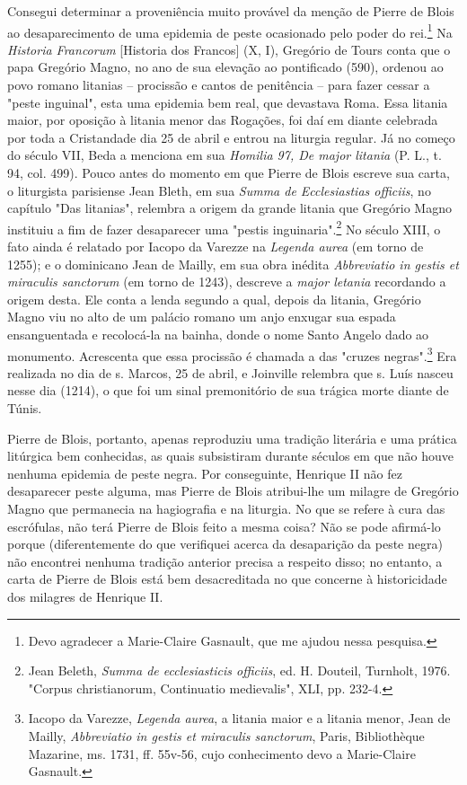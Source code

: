 \documentclass[a5paper]{book}
\begin{document}
Consegui determinar a proveniência muito provável da menção de Pierre de Blois ao desaparecimento de uma epidemia de peste ocasionado pelo poder do rei.\footnote{Devo agradecer a Marie-Claire Gasnault, que me ajudou nessa pesquisa.} Na \textit{Historia Francorum} [Historia dos Francos] (X, I), Gregório de Tours conta que o papa Gregório Magno, no ano de sua elevação ao pontif{\kern0pt}icado (590), ordenou ao povo romano litanias -- procissão e cantos de penitência -- para fazer cessar a "peste inguinal", esta uma epidemia bem real, que devastava Roma. Essa litania maior, por oposição à litania menor das Rogações, foi daí em diante celebrada por toda a Cristandade dia 25 de abril e entrou na liturgia regular. Já no começo do século VII, Beda a menciona em sua \textit{Homilia 97, De major litania} (P. L., t. 94, col. 499). Pouco antes do momento em que Pierre de Blois escreve sua carta, o liturgista parisiense Jean Bleth, em sua \textit{Summa de Ecclesiastias of{\kern0pt}f{\kern0pt}iciis}, no capítulo "Das litanias", relembra a origem da grande litania que Gregório Magno instituiu a f{\kern0pt}im de fazer desaparecer uma "pestis inguinaria".\footnote{Jean Beleth, \textit{Summa de ecclesiasticis of{\kern0pt}f{\kern0pt}iciis}, ed. H. Douteil, Turnholt, 1976. "Corpus christianorum, Continuatio medievalis", XLI, pp. 232-4.} No século XIII, o fato ainda é relatado por Iacopo da Varezze na \textit{Legenda aurea} (em torno de 1255); e o dominicano Jean de Mailly, em sua obra inédita \textit{Abbreviatio in gestis et miraculis sanctorum} (em torno de 1243), descreve a \textit{major letania} recordando a origem desta. Ele conta a lenda segundo a qual, depois da litania, Gregório Magno viu no alto de um palácio romano um anjo enxugar sua espada ensanguentada e recolocá-la na bainha, donde o nome Santo Angelo dado ao monumento. Acrescenta que essa procissão é chamada a das "cruzes negras".\footnote{Iacopo da Varezze, \textit{Legenda aurea}, a litania maior e a litania menor, Jean de Mailly, \textit{Abbreviatio in gestis et miraculis sanctorum}, Paris, Bibliothèque Mazarine, ms. 1731, f{\kern0pt}f. 55v-56, cujo conhecimento devo a Marie-Claire Gasnault.} Era realizada no dia de s. Marcos, 25 de abril, e Joinville relembra que s. Luís nasceu nesse dia (1214), o que foi um sinal premonitório de sua trágica morte diante de Túnis.

Pierre de Blois, portanto, apenas reproduziu uma tradição literária e uma prática litúrgica bem conhecidas, as quais subsistiram durante séculos em que não houve nenhuma epidemia de peste negra. Por conseguinte, Henrique II não fez desaparecer peste alguma, mas Pierre de Blois atribui-lhe um milagre de Gregório Magno que permanecia na hagiograf{\kern0pt}ia e na liturgia. No que se refere à cura das escrófulas, não terá Pierre de Blois feito a mesma coisa? Não se pode af{\kern0pt}irmá-lo porque (diferentemente do que verif{\kern0pt}iquei acerca da desaparição da peste negra) não encontrei nenhuma tradição anterior precisa a respeito disso; no entanto, a carta de Pierre de Blois está bem desacreditada no que concerne à historicidade dos milagres de Henrique II.
\end{document}
